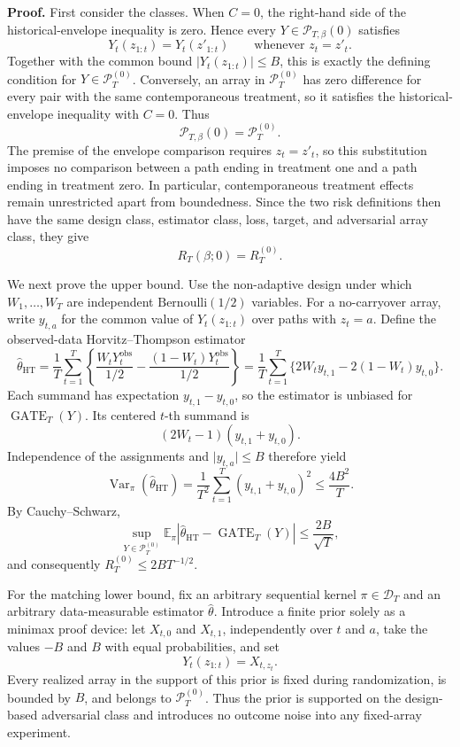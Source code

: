 \textbf{Proof.} First consider the classes.  When \(C=0\), the right-hand side of the historical-envelope inequality is zero.  Hence every \(Y\in\mathcal P_{T,\beta}(0)\) satisfies
\[
Y_t(z_{1:t})=Y_t(z'_{1:t})\qquad\text{whenever }z_t=z'_t.
\]
Together with the common bound \(\lvert Y_t(z_{1:t})\rvert\le B\), this is exactly the defining condition for \(Y\in\mathcal P_T^{(0)}\).  Conversely, an array in \(\mathcal P_T^{(0)}\) has zero difference for every pair with the same contemporaneous treatment, so it satisfies the historical-envelope inequality with \(C=0\).  Thus
\[
\mathcal P_{T,\beta}(0)=\mathcal P_T^{(0)}.
\]
The premise of the envelope comparison requires \(z_t=z'_t\), so this substitution imposes no comparison between a path ending in treatment one and a path ending in treatment zero.  In particular, contemporaneous treatment effects remain unrestricted apart from boundedness.  Since the two risk definitions then have the same design class, estimator class, loss, target, and adversarial array class, they give
\[
R_T(\beta;0)=R_T^{(0)}.
\]

We next prove the upper bound.  Use the non-adaptive design under which \(W_1,\ldots,W_T\) are independent \(\mathrm{Bernoulli}(1/2)\) variables.  For a no-carryover array, write \(y_{t,a}\) for the common value of \(Y_t(z_{1:t})\) over paths with \(z_t=a\).  Define the observed-data Horvitz--Thompson estimator
\[
\widehat\theta_{\mathrm{HT}}
=\frac1T\sum_{t=1}^T\left\{\frac{W_tY_t^{\mathrm{obs}}}{1/2}-\frac{(1-W_t)Y_t^{\mathrm{obs}}}{1/2}\right\}
=\frac1T\sum_{t=1}^T\{2W_ty_{t,1}-2(1-W_t)y_{t,0}\}.
\]
Each summand has expectation \(y_{t,1}-y_{t,0}\), so the estimator is unbiased for \(\operatorname{GATE}_T(Y)\).  Its centered \(t\)-th summand is
\[
(2W_t-1)(y_{t,1}+y_{t,0}).
\]
Independence of the assignments and \(\lvert y_{t,a}\rvert\le B\) therefore yield
\[
\operatorname{Var}_\pi(\widehat\theta_{\mathrm{HT}})
=\frac1{T^2}\sum_{t=1}^T(y_{t,1}+y_{t,0})^2
\le \frac{4B^2}{T}.
\]
By Cauchy--Schwarz,
\[
\sup_{Y\in\mathcal P_T^{(0)}}
\mathbb E_\pi\left\lvert\widehat\theta_{\mathrm{HT}}-\operatorname{GATE}_T(Y)\right\rvert
\le \frac{2B}{\sqrt T},
\]
and consequently \(R_T^{(0)}\le 2B T^{-1/2}\).

For the matching lower bound, fix an arbitrary sequential kernel \(\pi\in\mathcal D_T\) and an arbitrary data-measurable estimator \(\widehat\theta\).  Introduce a finite prior solely as a minimax proof device: let \(X_{t,0}\) and \(X_{t,1}\), independently over \(t\) and \(a\), take the values \(-B\) and \(B\) with equal probabilities, and set
\[
Y_t(z_{1:t})=X_{t,z_t}.
\]
Every realized array in the support of this prior is fixed during randomization, is bounded by \(B\), and belongs to \(\mathcal P_T^{(0)}\).  Thus the prior is supported on the design-based adversarial class and introduces no outcome noise into any fixed-array experiment.

